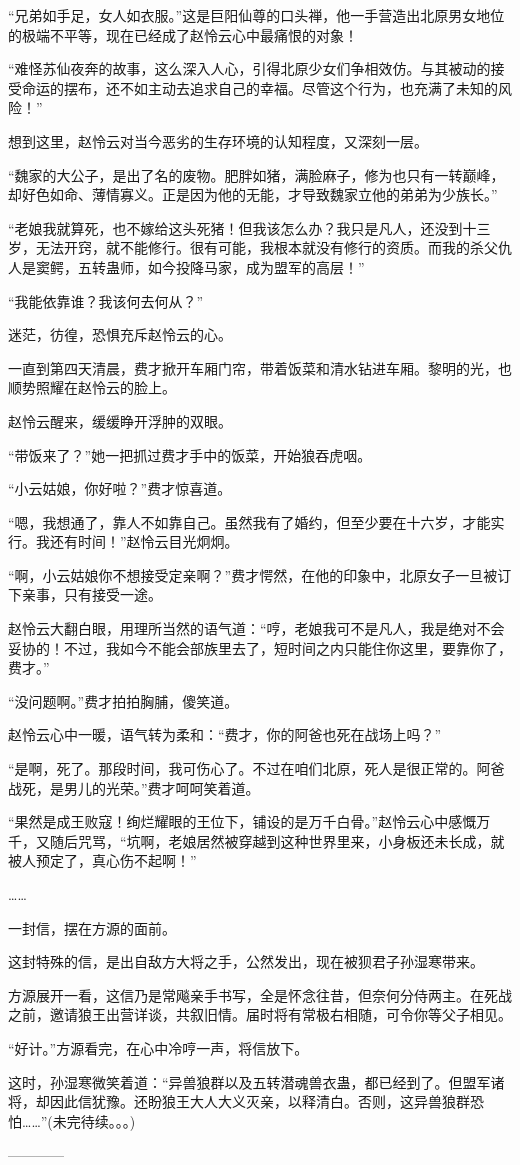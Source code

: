 \begin{this_body}
“兄弟如手足，女人如衣服。”这是巨阳仙尊的口头禅，他一手营造出北原男女地位的极端不平等，现在已经成了赵怜云心中最痛恨的对象！

“难怪苏仙夜奔的故事，这么深入人心，引得北原少女们争相效仿。与其被动的接受命运的摆布，还不如主动去追求自己的幸福。尽管这个行为，也充满了未知的风险！”

想到这里，赵怜云对当今恶劣的生存环境的认知程度，又深刻一层。

“魏家的大公子，是出了名的废物。肥胖如猪，满脸麻子，修为也只有一转巅峰，却好色如命、薄情寡义。正是因为他的无能，才导致魏家立他的弟弟为少族长。”

“老娘我就算死，也不嫁给这头死猪！但我该怎么办？我只是凡人，还没到十三岁，无法开窍，就不能修行。很有可能，我根本就没有修行的资质。而我的杀父仇人是窦鳄，五转蛊师，如今投降马家，成为盟军的高层！”

“我能依靠谁？我该何去何从？”

迷茫，彷徨，恐惧充斥赵怜云的心。

一直到第四天清晨，费才掀开车厢门帘，带着饭菜和清水钻进车厢。黎明的光，也顺势照耀在赵怜云的脸上。

赵怜云醒来，缓缓睁开浮肿的双眼。

“带饭来了？”她一把抓过费才手中的饭菜，开始狼吞虎咽。

“小云姑娘，你好啦？”费才惊喜道。

“嗯，我想通了，靠人不如靠自己。虽然我有了婚约，但至少要在十六岁，才能实行。我还有时间！”赵怜云目光炯炯。

“啊，小云姑娘你不想接受定亲啊？”费才愕然，在他的印象中，北原女子一旦被订下亲事，只有接受一途。

赵怜云大翻白眼，用理所当然的语气道：“哼，老娘我可不是凡人，我是绝对不会妥协的！不过，我如今不能会部族里去了，短时间之内只能住你这里，要靠你了，费才。”

“没问题啊。”费才拍拍胸脯，傻笑道。

赵怜云心中一暖，语气转为柔和：“费才，你的阿爸也死在战场上吗？”

“是啊，死了。那段时间，我可伤心了。不过在咱们北原，死人是很正常的。阿爸战死，是男儿的光荣。”费才呵呵笑着道。

“果然是成王败寇！绚烂耀眼的王位下，铺设的是万千白骨。”赵怜云心中感慨万千，又随后咒骂，“坑啊，老娘居然被穿越到这种世界里来，小身板还未长成，就被人预定了，真心伤不起啊！”

……

一封信，摆在方源的面前。

这封特殊的信，是出自敌方大将之手，公然发出，现在被狈君子孙湿寒带来。

方源展开一看，这信乃是常飚亲手书写，全是怀念往昔，但奈何分侍两主。在死战之前，邀请狼王出营详谈，共叙旧情。届时将有常极右相随，可令你等父子相见。

“好计。”方源看完，在心中冷哼一声，将信放下。

这时，孙湿寒微笑着道：“异兽狼群以及五转潜魂兽衣蛊，都已经到了。但盟军诸将，却因此信犹豫。还盼狼王大人大义灭亲，以释清白。否则，这异兽狼群恐怕……”(未完待续。。。)

------------

\end{this_body}

